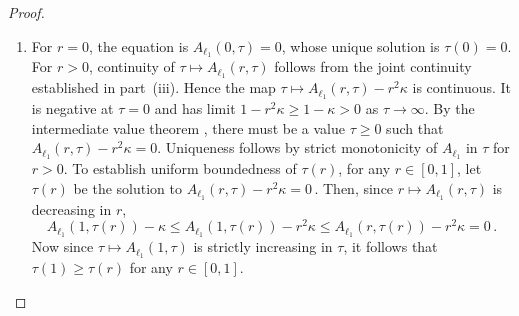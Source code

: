 \documentclass{article}
\theoremstyle{definition}
\begin{document}
\begin{bibunit}
\begin{proof}
\begin{enumerate}[label=(\roman{*})]
		Finally, $(r,\tau)\mapsto A_{\ell_1}(r,\tau)$ is jointly continuous
		on $[0,1]\times\Re_{\geq0}$ by dominated convergence, since
		$$
			\min\{\tau^2,W(r)^2\}
			\leq
			W(r)^2
			\leq
			Z^2+1 \,. 
		$$
		The strict decrease on $(0,1)$ therefore extends to $[0,1]$ by
		continuity at the endpoints.
        \item For $r=0$, the equation is $A_{\ell_1}(0,\tau)=0$, whose
	   unique solution is $\tau(0)=0$. For $r>0$, continuity of
	   $\tau\mapsto A_{\ell_1}(r,\tau)$ follows from the joint continuity
	   established in part~(iii). Hence the map
	   $\tau \mapsto A_{\ell_1}(r, \tau) - r^2 \kappa$ is continuous.
	   It is negative at $\tau=0$ and has limit $1-r^2\kappa\geq 1-\kappa>0$
	   as $\tau\to\infty$. By the intermediate value theorem \citep[Theorem~4.23]{rudin+etal:1976}, there must be
	   a value $\tau \geq0$ such that
	   $A_{\ell_1}(r, \tau) - r^2\kappa = 0$. Uniqueness follows
	   by strict monotonicity of $A_{\ell_1}$ in $\tau$ for $r>0$.
	   To establish uniform boundedness of $\tau(r)$, for any $r \in [0,1]$, let $\tau(r)$ be the solution to $A_{\ell_1}(r, \tau) - r^2 \kappa = 0 \,.$
	   Then, since $r \mapsto A_{\ell_1}(r, \tau)$ is decreasing in $r$,
	   $$
		A_{\ell_1}(1, \tau(r)) - \kappa \leq A_{\ell_1}(1, \tau(r)) - r^2 \kappa  \leq  A_{\ell_1}(r, \tau(r))- r^2 \kappa = 0 \,.
	   $$
	   Now since $\tau \mapsto A_{\ell_1}(1,\tau)$ is strictly increasing in $\tau$, it follows that $\tau(1) \geq \tau(r)$ for any $r \in [0,1]$.


\end{enumerate}
\end{proof}
\end{bibunit}
\end{document}
